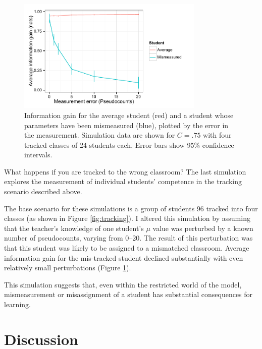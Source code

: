 \documentclass[10pt,letterpaper]{article}
\begin{document}
\begin{figure}
\begin{center}
\includegraphics[width=3.5in]{figures/mismeasured.pdf}
\end{center}
\caption{\label{fig:mismeasure} Information gain for the average student (red) and a student whose parameters have been mismeasured (blue), plotted by the error in the measurement. Simulation data are shown for $C=.75$ with four tracked classes of 24 students each. Error bars show 95\% confidence intervals.}
\end{figure}

What happens if you are tracked to the wrong classroom? The last simulation explores the measurement of individual students' competence in the tracking scenario described above. 

The base scenario for these simulations is a group of students 96 tracked into four classes (as shown in Figure \ref{fig:tracking}). I altered this simulation by assuming that the teacher's knowledge of one student's $\mu$ value was perturbed by a known number of pseudocounts, varying from 0--20. The result of this perturbation was that this student was likely to be assigned to a mismatched classroom. Average information gain for the mis-tracked student declined substantially with even relatively small perturbations (Figure \ref{fig:mismeasure}). 

This simulation suggests that, even within the restricted world of the model, mismeasurement or misassignment of a student has substantial consequences for learning.

\section{Discussion}
\end{document}

